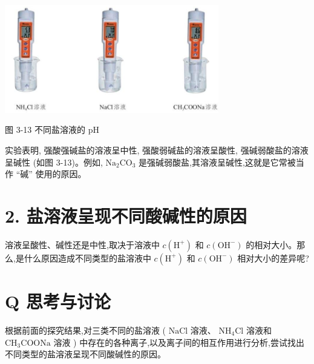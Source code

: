 \documentclass[10pt]{article}
\begin{document}
\begin{center}
\includegraphics[max width=0.7\textwidth]{images/0190da9d-8bfd-732f-bc2c-0b21d0f13b91_77_839727.jpg}
\end{center}

图 3-13 不同盐溶液的 \(\mathrm{{pH}}\)

实验表明, 强酸强碱盐的溶液呈中性, 强酸弱碱盐的溶液呈酸性, 强碱弱酸盐的溶液呈碱性 (如图 3-13)。例如, \({\mathrm{{Na}}}_{2}{\mathrm{{CO}}}_{3}\) 是强碱弱酸盐,其溶液呈碱性,这就是它常被当作 “碱” 使用的原因。

\section*{2. 盐溶液呈现不同酸碱性的原因}

溶液呈酸性、碱性还是中性,取决于溶液中 \(c\left( {\mathrm{H}}^{ + }\right)\) 和 \(c\left( {\mathrm{{OH}}}^{ - }\right)\) 的相对大小。那么,是什么原因造成不同类型的盐溶液中 \(c\left( {\mathrm{H}}^{ + }\right)\) 和 \(c\left( {\mathrm{{OH}}}^{ - }\right)\) 相对大小的差异呢?

\section*{Q 思考与讨论}

根据前面的探究结果,对三类不同的盐溶液 ( \(\mathrm{{NaCl}}\) 溶液、 \({\mathrm{{NH}}}_{4}\mathrm{{Cl}}\) 溶液和 \({\mathrm{{CH}}}_{3}\mathrm{{COONa}}\) 溶液 ) 中存在的各种离子,以及离子间的相互作用进行分析,尝试找出不同类型的盐溶液呈现不同酸碱性的原因。

\begin{center}
\end{center}
\end{document}
